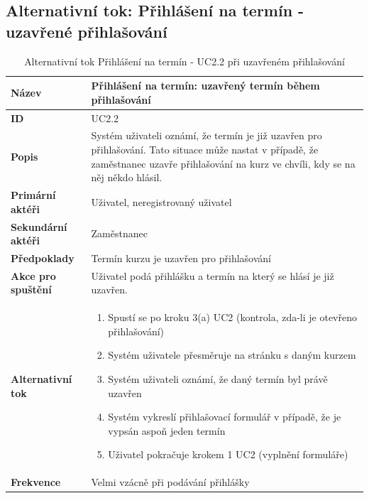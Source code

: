 \documentclass[12pt,a4paper,titlepage,final]{report}
\begin{document}
\subsection{Alternativní tok: Přihlášení na termín - uzavřené přihlašování}
\begin{table}[!h]
	\begin{center}
    \begin{tabular}{ | p{4.5cm} | p{13cm} | }
    \hline
    \textbf{Název} & Přihlášení na termín: uzavřený termín během přihlašování
    \\ \hline
    
	\textbf{ID} & UC2.2
	\\ \hline
	
	\textbf{Popis} & Systém uživateli oznámí, že termín je již uzavřen pro přihlašování. Tato situace může nastat v případě, že zaměstnanec uzavře přihlašování na kurz ve chvíli, kdy se na něj někdo hlásil.
	\\ \hline
	    
	\textbf{Primární aktéři} & Uživatel, neregistrovaný uživatel
	\\ \hline
	
	\textbf{Sekundární aktéři} & Zaměstnanec   
	\\ \hline
	
	\textbf{Předpoklady} & Termín kurzu je uzavřen pro přihlašování
    \\ \hline    
        
    \textbf{Akce pro spuštění} & Uživatel podá přihlášku a termín na který se hlásí je již uzavřen.
    \\ \hline
    
    \textbf{Alternativní tok} & 
    \vspace{-3.5mm}
	\begin{enumerate}
        \itemsep0em 	
		\item Spustí se po kroku 3(a) UC2 (kontrola, zda-li je otevřeno přihlašování)
		\item Systém uživatele přesměruje na stránku s daným kurzem
		\item Systém uživateli oznámí, že daný termín byl právě uzavřen
		\item Systém vykreslí přihlašovací formulář v případě, že je vypsán aspoň jeden termín
		\item Uživatel pokračuje krokem 1 UC2 (vyplnění formuláře)
	\end{enumerate}	     
    \\ \hline    
    
	\textbf{Frekvence} & Velmi vzácně při podávání přihlášky
	\\ \hline
	\end{tabular}
		\caption{Alternativní tok Přihlášení na termín - UC2.2 při uzavřeném přihlašování}
	\end{center}

\end{table}
\end{document}
